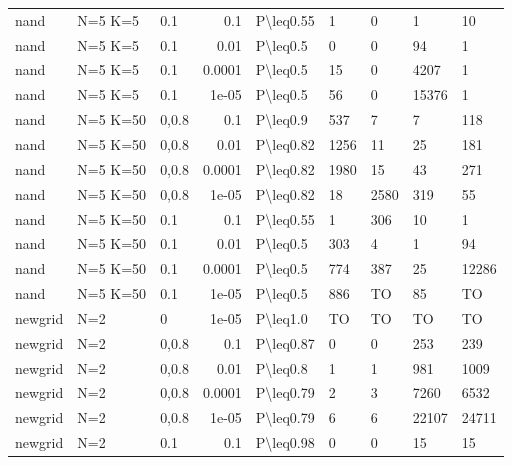 \begin{longtable}{lllrlllll}
 nand          & N=5 K=5   & 0.1   & 0.1    & P\textbackslash{}leq0.55  & 1    & 0    & 1        & 10      \\
 nand          & N=5 K=5   & 0.1   & 0.01   & P\textbackslash{}leq0.5   & 0    & 0    & 94       & 1       \\
 nand          & N=5 K=5   & 0.1   & 0.0001 & P\textbackslash{}leq0.5   & 15   & 0    & 4207     & 1       \\
 nand          & N=5 K=5   & 0.1   & 1e-05  & P\textbackslash{}leq0.5   & 56   & 0    & 15376    & 1       \\
 nand          & N=5 K=50  & 0,0.8 & 0.1    & P\textbackslash{}leq0.9   & 537  & 7    & 7        & 118     \\
 nand          & N=5 K=50  & 0,0.8 & 0.01   & P\textbackslash{}leq0.82  & 1256 & 11   & 25       & 181     \\
 nand          & N=5 K=50  & 0,0.8 & 0.0001 & P\textbackslash{}leq0.82  & 1980 & 15   & 43       & 271     \\
 nand          & N=5 K=50  & 0,0.8 & 1e-05  & P\textbackslash{}leq0.82  & 18   & 2580 & 319      & 55      \\
 nand          & N=5 K=50  & 0.1   & 0.1    & P\textbackslash{}leq0.55  & 1    & 306  & 10       & 1       \\
 nand          & N=5 K=50  & 0.1   & 0.01   & P\textbackslash{}leq0.5   & 303  & 4    & 1        & 94      \\
 nand          & N=5 K=50  & 0.1   & 0.0001 & P\textbackslash{}leq0.5   & 774  & 387  & 25       & 12286   \\
 nand          & N=5 K=50  & 0.1   & 1e-05  & P\textbackslash{}leq0.5   & 886  & TO   & 85       & TO      \\
 newgrid       & N=2       & 0     & 1e-05  & P\textbackslash{}leq1.0   & TO   & TO   & TO       & TO      \\
 newgrid       & N=2       & 0,0.8 & 0.1    & P\textbackslash{}leq0.87  & 0    & 0    & 253      & 239     \\
 newgrid       & N=2       & 0,0.8 & 0.01   & P\textbackslash{}leq0.8   & 1    & 1    & 981      & 1009    \\
 newgrid       & N=2       & 0,0.8 & 0.0001 & P\textbackslash{}leq0.79  & 2    & 3    & 7260     & 6532    \\
 newgrid       & N=2       & 0,0.8 & 1e-05  & P\textbackslash{}leq0.79  & 6    & 6    & 22107    & 24711   \\
 newgrid       & N=2       & 0.1   & 0.1    & P\textbackslash{}leq0.98  & 0    & 0    & 15       & 15      \\

\end{longtable}
